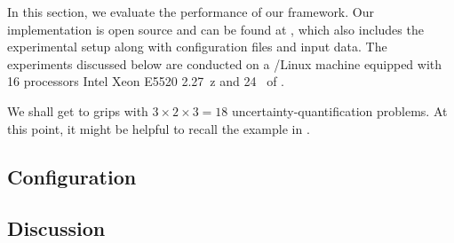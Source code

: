 In this section, we evaluate the performance of our framework. Our
implementation is open source and can be found at \cite{sources}, which also
includes the experimental setup along with configuration files and input data.
The experiments discussed below are conducted on a /Linux machine
equipped with 16 processors Intel Xeon E5520 2.27~z and 24~ of
.

We shall get to grips with $3 \times 2 \times 3 = 18$ uncertainty-quantification
problems.  At this point, it might be helpful to
recall the example in .

\subsection{Configuration} 


\subsection{Discussion}

